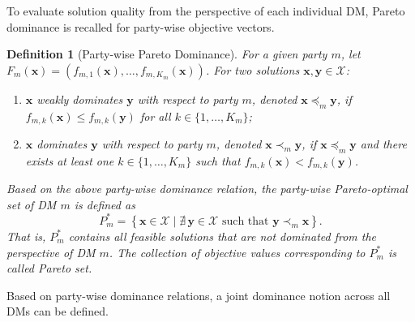 \documentclass[journal]{IEEEtran}
\newtheorem{definition}{Definition}
\begin{document}
To evaluate solution quality from the perspective of each individual DM, Pareto dominance is recalled for party-wise objective vectors.

\begin{definition}[Party-wise Pareto Dominance]
	\label{def:pareto_dominance}
	For a given party $m$, let $F_m(\mathbf{x}) = (f_{m,1}(\mathbf{x}),\dots,f_{m,K_m}(\mathbf{x}))$. For two solutions $\mathbf{x}, \mathbf{y} \in \mathcal{X}$:
	\begin{enumerate}
		\item $\mathbf{x}$ weakly dominates $\mathbf{y}$ with respect to party $m$, denoted $\mathbf{x} \preceq_m \mathbf{y}$, if $f_{m,k}(\mathbf{x}) \le f_{m,k}(\mathbf{y})$ for all $k \in \{1,\dots,K_m\}$;
		\item $\mathbf{x}$ dominates $\mathbf{y}$ with respect to party $m$, denoted $\mathbf{x} \prec_m \mathbf{y}$, if $\mathbf{x} \preceq_m \mathbf{y}$ and there exists at least one $k \in \{1,\dots,K_m\}$ such that $f_{m,k}(\mathbf{x}) < f_{m,k}(\mathbf{y})$.
	\end{enumerate}
	
	Based on the above party-wise dominance relation, the party-wise Pareto-optimal set of DM $m$ is defined as 
		\begin{equation*}
			P_m^*
			=
			\left\{
			\mathbf{x}\in\mathcal{X}
			\mid
			\nexists\,\mathbf{y}\in\mathcal{X}
			\text{ such that }
			\mathbf{y}\prec_m\mathbf{x}
			\right\}.
		\end{equation*}
		That is, $P_m^*$ contains all feasible solutions that are not dominated
		from the perspective of DM $m$. The collection of objective values corresponding to $P_m^*$ is called Pareto set.
\end{definition}


Based on party-wise dominance relations, a joint dominance notion across all DMs can be defined.
\end{document}
